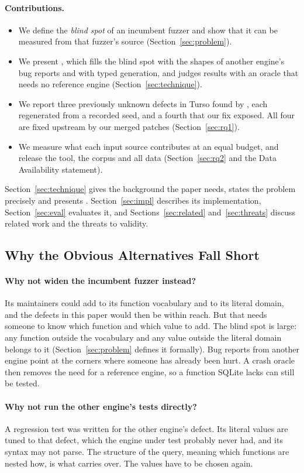 \paragraph{Contributions.}
\begin{itemize}
  \item We define the \emph{blind spot} of an incumbent fuzzer and show that it
        can be measured from that fuzzer's source (Section~\ref{sec:problem}).
  \item We present \tool, which fills the blind spot with the shapes of another
        engine's bug reports and with typed generation, and judges results with an
        oracle that needs no reference engine (Section~\ref{sec:technique}).
  \item We report three previously unknown defects in Turso found by \tool, each
        regenerated from a recorded seed, and a fourth that our fix exposed. All
        four are fixed upstream by our merged patches (Section~\ref{sec:rq1}).
  \item We measure what each input source contributes at an equal budget, and
        release the tool, the corpus and all data
        (Section~\ref{sec:rq2} and the Data Availability statement).
\end{itemize}

Section~\ref{sec:technique} gives the background the paper needs, states the
problem precisely and presents \tool. Section~\ref{sec:impl} describes its
implementation, Section~\ref{sec:eval} evaluates it, and
Sections~\ref{sec:related} and~\ref{sec:threats} discuss related work and the
threats to validity.

\subsection{Why the Obvious Alternatives Fall Short}

\paragraph{Why not widen the incumbent fuzzer instead?} Its maintainers could add
 to its function vocabulary and \imax to its literal domain, and the
defects in this paper would then be within reach. But that needs someone to know
which function and which value to add. The blind spot is large: any function
outside the vocabulary and any value outside the literal domain belongs to it
(Section~\ref{sec:problem} defines it formally). Bug reports from another engine point at the corners where
someone has already been hurt. A crash oracle then removes the need for a
reference engine, so a function SQLite lacks can still be tested.

\paragraph{Why not run the other engine's tests directly?} A regression test was
written for the other engine's defect. Its literal values are tuned to that
defect, which the engine under test probably never had, and its syntax may not
parse. The structure of the query, meaning which functions are nested how, is
what carries over. The values have to be chosen again.
